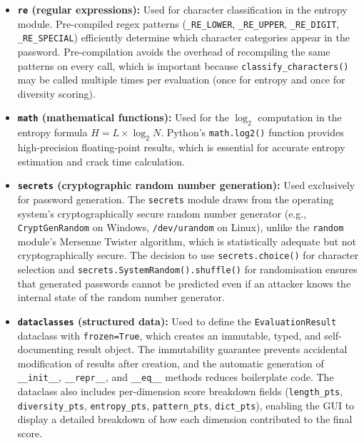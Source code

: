 \begin{itemize}
    \item \textbf{\texttt{re} (regular expressions):} Used for character classification in the entropy module. Pre-compiled regex patterns (\texttt{\_RE\_LOWER}, \texttt{\_RE\_UPPER}, \texttt{\_RE\_DIGIT}, \texttt{\_RE\_SPECIAL}) efficiently determine which character categories appear in the password. Pre-compilation avoids the overhead of recompiling the same patterns on every call, which is important because \texttt{classify\_characters()} may be called multiple times per evaluation (once for entropy and once for diversity scoring).

    \item \textbf{\texttt{math} (mathematical functions):} Used for the $\log_2$ computation in the entropy formula $H = L \times \log_2 N$. Python's \texttt{math.log2()} function provides high-precision floating-point results, which is essential for accurate entropy estimation and crack time calculation.

    \item \textbf{\texttt{secrets} (cryptographic random number generation):} Used exclusively for password generation. The \texttt{secrets} module draws from the operating system's cryptographically secure random number generator (e.g., \texttt{CryptGenRandom} on Windows, \texttt{/dev/urandom} on Linux), unlike the \texttt{random} module's Mersenne Twister algorithm, which is statistically adequate but not cryptographically secure. The decision to use \texttt{secrets.choice()} for character selection and \texttt{secrets.SystemRandom().shuffle()} for randomisation ensures that generated passwords cannot be predicted even if an attacker knows the internal state of the random number generator.

    \item \textbf{\texttt{dataclasses} (structured data):} Used to define the \texttt{EvaluationResult} dataclass with \texttt{frozen=True}, which creates an immutable, typed, and self-documenting result object. The immutability guarantee prevents accidental modification of results after creation, and the automatic generation of \texttt{\_\_init\_\_}, \texttt{\_\_repr\_\_}, and \texttt{\_\_eq\_\_} methods reduces boilerplate code. The dataclass also includes per-dimension score breakdown fields (\texttt{length\_pts}, \texttt{diversity\_pts}, \texttt{entropy\_pts}, \texttt{pattern\_pts}, \texttt{dict\_pts}), enabling the GUI to display a detailed breakdown of how each dimension contributed to the final score.


\end{itemize}
